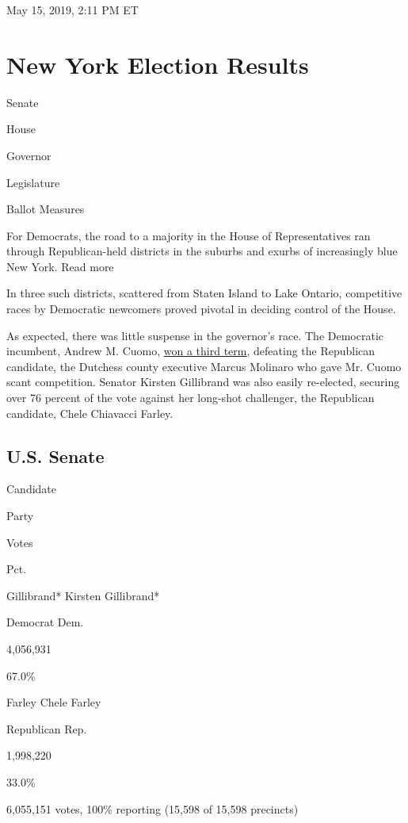 May 15, 2019, 2:11 PM ET

\hypertarget{new-york-election-results}{%
\section{New York Election Results}\label{new-york-election-results}}

Senate

House

Governor

Legislature

Ballot Measures

For Democrats, the road to a majority in the House of Representatives
ran through Republican-held districts in the suburbs and exurbs of
increasingly blue New York. Read more

In three such districts, scattered from Staten Island to Lake Ontario,
competitive races by Democratic newcomers proved pivotal in deciding
control of the House.

As expected, there was little suspense in the governor's race. The
Democratic incumbent, Andrew M. Cuomo,
\href{https://www.nytimes3xbfgragh.onion/2018/11/06/nyregion/andrew-cuomo-wins-governor.html}{won
a third term}, defeating the Republican candidate, the Dutchess county
executive Marcus Molinaro who gave Mr. Cuomo scant competition. Senator
Kirsten Gillibrand was also easily re-elected, securing over 76 percent
of the vote against her long-shot challenger, the Republican candidate,
Chele Chiavacci Farley.

\hypertarget{us-senate}{%
\subsection{U.S. Senate}\label{us-senate}}

Candidate

Party

Votes

Pct.

 Gillibrand* Kirsten Gillibrand*

Democrat Dem.

4,056,931

67.0\%

 Farley Chele Farley

Republican Rep.

1,998,220

33.0\%

6,055,151 votes, 100\% reporting (15,598 of 15,598 precincts)

